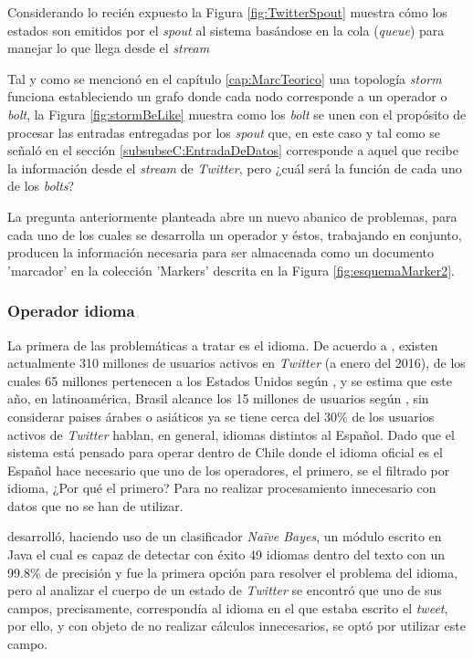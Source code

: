 Considerando lo recién expuesto la Figura \ref{fig:TwitterSpout} muestra cómo los estados son emitidos por el \textit{spout} al sistema basándose en la cola (\textit{queue}) para manejar lo que llega desde el \textit{stream}

Tal y como se mencionó en el capítulo \ref{cap:MarcTeorico} una topología \textit{storm} funciona estableciendo un grafo donde cada nodo corresponde a un operador o \textit{bolt}, la Figura \ref{fig:stormBeLike} muestra como los \textit{bolt} se unen con el propósito de procesar las entradas entregadas por los \textit{spout} que, en este caso y tal como se señaló en el sección \ref{subsubseC:EntradaDeDatos} corresponde a aquel que recibe la información desde el \textit{stream} de \textit{Twitter}, pero ¿cuál será la función de cada uno de los \textit{bolts}?

La pregunta anteriormente planteada abre un nuevo abanico de problemas, para cada uno de los cuales se desarrolla un operador y éstos, trabajando en conjunto, producen la información necesaria para ser almacenada como un documento 'marcador' en la colección 'Markers' descrita en la Figura \ref{fig:esquemaMarker2}.

\subsubsection*{Operador idioma}
\label{subsubsec:1op}

La primera de las problemáticas a tratar es el idioma. De acuerdo a \cite{TwitterActiveUsers}, existen actualmente 310 millones de usuarios activos en \textit{Twitter} (a enero del 2016), de los cuales 65 millones pertenecen a los Estados Unidos según \cite{TwitterStats1}, y se estima que este año, en latinoamérica, Brasil alcance los 15 millones de usuarios según \cite{TwitterStats2}, sin considerar paises árabes o asiáticos ya se tiene cerca del 30\% de los usuarios activos de \textit{Twitter} hablan, en general, idiomas distintos al Español. Dado que el sistema está pensado para operar dentro de Chile donde el idioma oficial es el Español hace necesario que uno de los operadores, el primero, se el filtrado por idioma, ¿Por qué el primero? Para no realizar procesamiento innecesario con datos que no se han de utilizar.

\cite{languageDetector} desarrolló, haciendo uso de un clasificador \textit{Naïve Bayes}, un módulo escrito en Java el cual es capaz de detectar con éxito 49 idiomas dentro del texto con un 99.8\% de precisión y fue la primera opción para resolver el problema del idioma, pero al analizar el cuerpo de un estado de \textit{Twitter} se encontró que uno de sus campos, precisamente, correspondía al idioma en el que estaba escrito el \textit{tweet}, por ello, y con objeto de no realizar cálculos innecesarios, se optó por utilizar este campo.


